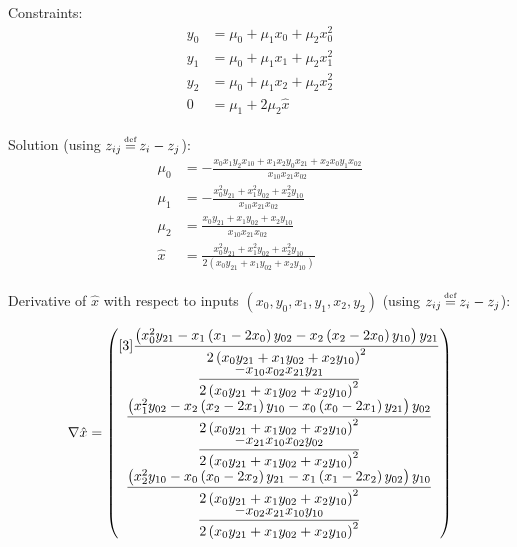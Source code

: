 %

Constraints:
\begin{align}
y_0 & = \mu_0+\mu_1 x_0+\mu_2 x_0^{2}  
\\
y_1 & = \mu_0+\mu_1 x_1+\mu_2 x_1^{2}  
\nonumber 
\\
y_2 & = \mu_0+\mu_1 x_2+\mu_2 x_2^{2}  
\nonumber 
\\
0 & = \mu_1 + 2 \mu_2 \hat{x}  
\nonumber 
\end{align}

Solution (using $z_{ij} \operatorname*{\overset{\underset{\mathrm{def}}{}}{=}} z_i - z_j$):
\begin{align}
\mu_0 & =
- \frac{
x_0 x_1 y_2 x_{10}
+
x_1 x_2 y_0 x_{21}
+
x_2 x_0 y_1 x_{02}
}{
x_{10} x_{21} x_{02}
} 
\\
\mu_1 & =
- \frac{
x_0^{2} y_{21}
+ 
x_1^{2} y_{02} 
+
x_2^{2} y_{10}
}{
x_{10} x_{21} x_{02}
} 
\nonumber \\
\mu_2 & = 
\frac{
x_0 y_{21} 
+
x_1 y_{02}
+
x_2 y_{10} 
}{
x_{10} x_{21} x_{02}
 } 
\nonumber  \\ 
 \hat{x} & = 
\frac{
x_0^{2} y_{21} 
 +
x_1^{2} y_{02} 
 +
x_2^{2} y_{10} 
}{
2 \left(
x_0 y_{21} 
+ 
x_1 y_{02} 
+ 
x_2 y_{10}  
\right)
}
\nonumber 
\end{align}

Derivative of $\hat{x}$ with respect to inputs
$(x_0,y_0,x_1,y_1,x_2,y_2)$
(using $z_{ij} \operatorname*{\overset{\underset{\mathrm{def}}{}}{=}} z_i - z_j$):

\begin{equation}
\nabla \hat{x} =
\begin{pmatrix}[3]
\dfrac{
\left(
x_0^2 y_{21}
-
x_1 \left( x_1 - 2 x_0 \right) y_{02}
- 
x_2 \left( x_2 - 2 x_0 \right) y_{10}
\right)
y_{21}
}{ %
2 \left( x_0 y_{21} + x_1 y_{02} + x_2 y_{10} \right)^{2}
} 
\\ %
\dfrac{
- x_{10} x_{02} x_{21} y_{21}
}{
2 \left( x_0 y_{21} + x_1 y_{02} + x_2 y_{10} \right)^{2}
} 
\\  %
\dfrac{
\left(
x_1^2 y_{02}
-
x_2 \left( x_2 - 2 x_1 \right) y_{10}
- 
x_0 \left( x_0 - 2 x_1 \right) y_{21}
\right)
y_{02}
}{ %
2 \left( x_0 y_{21} + x_1 y_{02} + x_2 y_{10} \right)^{2}
}
\\ %
\dfrac{
- x_{21} x_{10} x_{02} y_{02}
}{ %
2 \left( x_0 y_{21} + x_1 y_{02} + x_2 y_{10} \right)^{2}
} 
\\ %
\dfrac{
\left(
x_2^2 y_{10}
-
x_0 \left( x_0 - 2 x_2 \right) y_{21}
- 
x_1 \left( x_1 - 2 x_2 \right) y_{02}
\right)
y_{10}
}{ %
2 \left( x_0 y_{21} + x_1 y_{02} + x_2 y_{10} \right)^{2}
}
\\ %
\dfrac{
- x_{02} x_{21} x_{10} y_{10}
}{ %
2 \left( x_0 y_{21} + x_1 y_{02} + x_2 y_{10} \right)^{2}
}
\end{pmatrix}
\end{equation}

